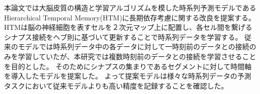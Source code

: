 \abstract
本論文では大脳皮質の構造と学習アルゴリズムを模した時系列予測モデルであるHierarchical Temporal Memory(HTM)に長期依存考慮に関する改良を提案する。
HTMは脳の神経細胞を表すセルを２次元マップ上に配置し、各セル間を繋げるシナプス接続をヘブ則に基づいて更新することで時系列データを学習する。
従来のモデルでは時系列データ中の各データに対して一時刻前のデータとの接続のみを学習していたが、本研究では複数時刻前のデータとの接続を学習させることを目的とした。
そのためにシナプスの集まりであるセグメントに対して時間軸を導入したモデルを提案した。
よって提案モデルは様々な時系列データの予測タスクにおいて従来モデルよりも高い精度を記録することを確認した。
